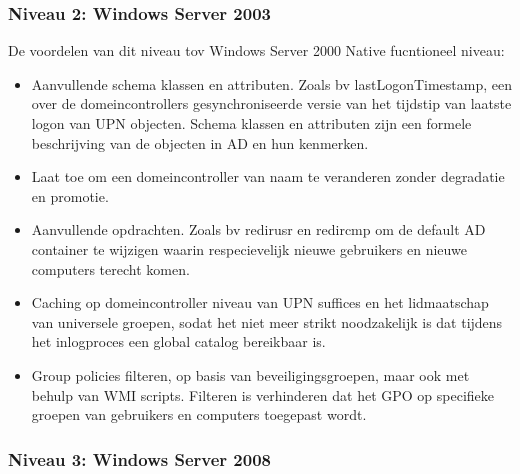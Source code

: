 \subsubsection{Niveau 2: Windows Server 2003}

De voordelen van dit niveau tov Windows Server 2000 Native fucntioneel niveau:
\begin{itemize}
	\item Aanvullende schema klassen en attributen. Zoals bv
		lastLogonTimestamp, een over de domeincontrollers
		gesynchroniseerde versie van het tijdstip van laatste logon van
		UPN objecten. Schema klassen en attributen zijn een formele
		beschrijving van de objecten in AD en hun kenmerken.
	\item Laat toe om een domeincontroller van naam te veranderen zonder
		degradatie en promotie.
	\item Aanvullende opdrachten. Zoals bv redirusr en redircmp om de
		default AD container te wijzigen waarin respecievelijk nieuwe
		gebruikers en nieuwe computers terecht komen.
	\item Caching op domeincontroller niveau van UPN suffices en het
		lidmaatschap van universele groepen, sodat het niet meer strikt
		noodzakelijk is dat tijdens het inlogproces een global catalog
		bereikbaar is.
	\item Group policies filteren, op basis van beveiligingsgroepen, maar
		ook met behulp van WMI scripts. Filteren is verhinderen dat het
		GPO op specifieke groepen van gebruikers en computers toegepast
		wordt.
\end{itemize}

\subsubsection{Niveau 3: Windows Server 2008}

